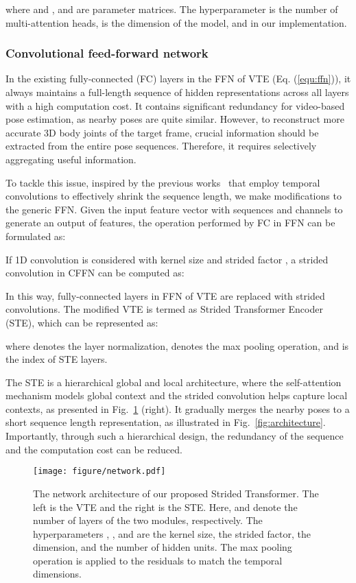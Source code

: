 \documentclass[journal]{IEEEtran}
\begin{document}
where  and , and  are parameter matrices. 
The hyperparameter  is the number of multi-attention heads,  is the dimension of the model, and  in our implementation. 

\subsubsection{Convolutional feed-forward network}
In the existing fully-connected (FC) layers in the FFN of VTE (Eq. (\ref{equ:ffn})), it always maintains a full-length sequence of hidden representations across all layers with a high computation cost. 
It contains significant redundancy for video-based pose estimation, as nearby poses are quite similar. 
However, to reconstruct more accurate 3D body joints of the target frame, crucial information should be extracted from the entire pose sequences. 
Therefore, it requires selectively aggregating useful information. 

To tackle this issue, inspired by the previous works~\cite{pavllo20193d,liu2020attention} that employ temporal convolutions to effectively shrink the sequence length, we make modifications to the generic FFN. 
Given the input feature vector  with  sequences and  channels to generate an output of  features, the operation performed by FC in FFN can be formulated as: 


If 1D convolution is considered with kernel size  and strided factor , a strided convolution in CFFN can be computed as:


In this way, fully-connected layers in FFN of VTE are replaced with strided convolutions. 
The modified VTE is termed as Strided Transformer Encoder (STE), which can be represented as:

where  denotes the layer normalization,  denotes the max pooling operation, and  is the index of STE layers. 

The STE is a hierarchical global and local architecture, where the self-attention mechanism models global context and the strided convolution helps capture local contexts, as presented in Fig.~\ref{fig:network} (right). 
It gradually merges the nearby poses to a short sequence length representation, as illustrated in Fig.~\ref{fig:architecture}. 
Importantly, through such a hierarchical design, the redundancy of the sequence and the computation cost can be reduced. 

\begin{figure}[t]
   \centering
   \texttt{[image: figure/network.pdf]}
   \caption
   {
      The network architecture of our proposed Strided Transformer. 
      The left is the VTE and the right is the STE. 
      Here,  and  denote the number of layers of the two modules, respectively. 
      The hyperparameters , ,  and  are the kernel size, the strided factor, the dimension, and the number of hidden units. 
      The max pooling operation is applied to the residuals to match the temporal dimensions. 
   }
   \label{fig:network}
\end{figure}
\end{document}
